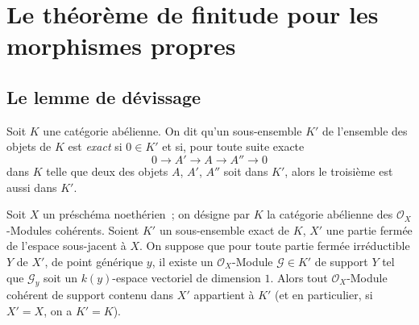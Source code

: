 \section{Le théorème de finitude pour les morphismes propres}
\label{section:III.3-fr}

\subsection{Le lemme de dévissage}
\label{subsection:III.3.1-fr}

\begin{definition}[3.1.1]
\label{III.3.1.1-fr}
Soit $K$ une catégorie abélienne. On dit qu'un sous-ensemble $K'$ de
l'ensemble des objets de $K$ est \emph{exact} si $0\in K'$ et si, pour toute
suite exacte
\[
0\longrightarrow A'\longrightarrow A\longrightarrow A''\longrightarrow0
\]
dans $K$ telle que deux des objets $A$, $A'$, $A''$ soit dans $K'$, alors le
troisième est aussi dans $K'$.
\end{definition}

\begin{theorem}[3.1.2]
\label{III.3.1.2-fr}
Soit $X$ un préschéma noethérien~; on désigne par $K$ la catégorie abélienne
des $\mathcal O_X$-Modules cohérents. Soient $K'$ un sous-ensemble exact de
$K$, $X'$ une partie fermée de l'espace sous-jacent à $X$. On suppose que
pour toute partie fermée irréductible $Y$ de $X'$, de point générique $y$, il
existe un $\mathcal O_X$-Module $\mathcal G\in K'$ de support $Y$ tel que $\mathcal G_y$ soit
un $k(y)$-espace vectoriel de dimension $1$. Alors tout $\mathcal O_X$-Module
cohérent de support contenu dans $X'$ appartient à $K'$ (et en particulier,
si $X'=X$, on a $K'=K$).
\end{theorem}

